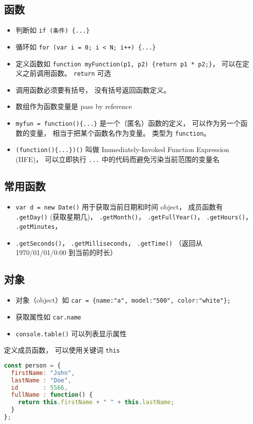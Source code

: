 \subsection{函数}
\begin{itemize}
\item 判断如 \verb|if (条件) {...}|
\item 循环如 \verb|for (var i = 0; i < N; i++) {...}|
\item 定义函数如 \verb|function myFunction(p1, p2) {return p1 * p2;}|， 可以在定义之前调用函数。 \verb|return| 可选
\item 调用函数必须要有括号， 没有括号返回函数定义。
\item 数组作为函数变量是 pass by reference
\item \verb|myfun = function(){...}| 是一个（匿名）函数的定义， 可以作为另一个函数的变量， 相当于把某个函数名作为变量。 类型为 \verb|function|。
\item \verb|(function(){...})()| 叫做 Immediately-Invoked Function Expression (IIFE)， 可以立即执行 \verb|...| 中的代码而避免污染当前范围的变量名
\end{itemize}

\subsection{常用函数}
\begin{itemize}
\item \verb|var d = new Date()| 用于获取当前日期和时间 object， 成员函数有 \verb|.getDay()| (获取星期几)， \verb|.getMonth()|， \verb|.getFullYear()|， \verb|.getHours()|， \verb|.getMinutes|，
\item \verb|.getSeconds()|， \verb|.getMilliseconds|， \verb|.getTime()| （返回从 1970/01/01/0:00 到当前的时长）
\end{itemize}

\subsection{对象}
\begin{itemize}
\item 对象（object）如 \verb|car = {name:"a", model:"500", color:"white"};|
\item 获取属性如 \verb|car.name|
\item \verb|console.table()| 可以列表显示属性
\end{itemize}

定义成员函数， 可以使用关键词 \verb|this|
\begin{lstlisting}[language=js]
const person = {
  firstName: "John",
  lastName : "Doe",
  id       : 5566,
  fullName : function() {
    return this.firstName + " " + this.lastName;
  }
};
\end{lstlisting}

